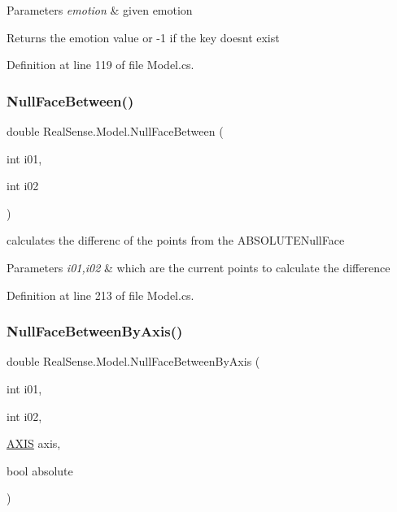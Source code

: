 \begin{DoxyParams}{Parameters}
{\em emotion} & given emotion \\
\hline
\end{DoxyParams}
\begin{DoxyReturn}{Returns}
the emotion value or -\/1 if the key doesn\textquotesingle{}t exist 
\end{DoxyReturn}


Definition at line 119 of file Model.\+cs.

\mbox{\label{class_real_sense_1_1_model_a03fd4fa56ceb5cbcebdbebb4b7a78158}} 
\subsubsection{\texorpdfstring{Null\+Face\+Between()}{NullFaceBetween()}}
{\footnotesize\ttfamily double Real\+Sense.\+Model.\+Null\+Face\+Between (\begin{DoxyParamCaption}\item[{int}]{i01,  }\item[{int}]{i02 }\end{DoxyParamCaption})}

calculates the differenc of the points from the A\+B\+S\+O\+L\+U\+T\+E\+Null\+Face 
\begin{DoxyParams}{Parameters}
{\em i01,i02} & which are the current points to calculate the difference \\
\hline
\end{DoxyParams}


Definition at line 213 of file Model.\+cs.

\mbox{\label{class_real_sense_1_1_model_aab86ce9f3027b3fca83d11a97353154c}} 
\subsubsection{\texorpdfstring{Null\+Face\+Between\+By\+Axis()}{NullFaceBetweenByAxis()}}
{\footnotesize\ttfamily double Real\+Sense.\+Model.\+Null\+Face\+Between\+By\+Axis (\begin{DoxyParamCaption}\item[{int}]{i01,  }\item[{int}]{i02,  }\item[{\hyperlink{class_real_sense_1_1_model_ab1d8b9992dae2162c48b52f6694f946b}{A\+X\+IS}}]{axis,  }\item[{bool}]{absolute }\end{DoxyParamCaption})}

